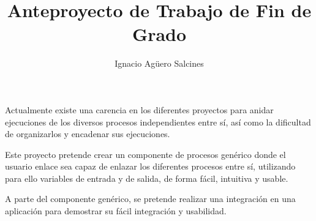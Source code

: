 \documentclass[a4paper,12pt]{article}
\title{Anteproyecto de Trabajo de Fin de Grado}
\author{Ignacio Agüero Salcines}
\begin{document}
	
	\maketitle
	
	Actualmente existe una carencia en los diferentes proyectos para anidar ejecuciones de los diversos procesos independientes entre sí, así como la dificultad de organizarlos y encadenar sus ejecuciones.
	
	Este proyecto pretende crear un componente de procesos genérico donde el usuario enlace sea capaz de enlazar los diferentes procesos entre sí, utilizando para ello variables de entrada y de salida, de forma fácil, intuitiva y usable.
	
	A parte del componente genérico, se pretende realizar una integración en una aplicación para demostrar su fácil integración y usabilidad.
	
\end{document}
